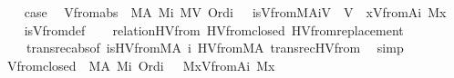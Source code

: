 \begin{isabellebody}
\isanewline
\ \ \isamarkupfalse%
\ {\isacharquery}{\kern0pt}case\ \isacommand{{\isachardot}{\kern0pt}}\isamarkupfalse%
\isanewline
{}\isamarkupfalse%
%
\endisatagproof
{\isafoldproof}%
%
\isadelimproof
\isanewline
%
\endisadelimproof
\isanewline
{}\isamarkupfalse%
\ Vfrom{\isacharunderscore}{\kern0pt}abs{\isacharcolon}{\kern0pt}\ {\isachardoublequoteopen}{\isasymlbrakk}\ M{\isacharparenleft}{\kern0pt}A{\isacharparenright}{\kern0pt}{\isacharsemicolon}{\kern0pt}\ M{\isacharparenleft}{\kern0pt}i{\isacharparenright}{\kern0pt}{\isacharsemicolon}{\kern0pt}\ M{\isacharparenleft}{\kern0pt}V{\isacharparenright}{\kern0pt}{\isacharsemicolon}{\kern0pt}\ Ord{\isacharparenleft}{\kern0pt}i{\isacharparenright}{\kern0pt}\ {\isasymrbrakk}\ {\isasymLongrightarrow}\ is{\isacharunderscore}{\kern0pt}Vfrom{\isacharparenleft}{\kern0pt}M{\isacharcomma}{\kern0pt}A{\isacharcomma}{\kern0pt}i{\isacharcomma}{\kern0pt}V{\isacharparenright}{\kern0pt}\ {\isasymlongleftrightarrow}\ V\ {\isacharequal}{\kern0pt}\ {\isacharbraceleft}{\kern0pt}x{\isasymin}Vfrom{\isacharparenleft}{\kern0pt}A{\isacharcomma}{\kern0pt}i{\isacharparenright}{\kern0pt}{\isachardot}{\kern0pt}\ M{\isacharparenleft}{\kern0pt}x{\isacharparenright}{\kern0pt}{\isacharbraceright}{\kern0pt}{\isachardoublequoteclose}\isanewline
%
\isadelimproof
\ \ %
\endisadelimproof
%
\isatagproof
{}\isamarkupfalse%
\ is{\isacharunderscore}{\kern0pt}Vfrom{\isacharunderscore}{\kern0pt}def\isanewline
\ \ \isamarkupfalse%
\ relation{}{\isacharunderscore}{\kern0pt}HVfrom\ HVfrom{\isacharunderscore}{\kern0pt}closed\ HVfrom{\isacharunderscore}{\kern0pt}replacement\ \isanewline
\ \ \ \ transrec{\isacharunderscore}{\kern0pt}abs{\isacharbrackleft}{\kern0pt}of\ {\isachardoublequoteopen}is{\isacharunderscore}{\kern0pt}HVfrom{\isacharparenleft}{\kern0pt}M{\isacharcomma}{\kern0pt}A{\isacharparenright}{\kern0pt}{\isachardoublequoteclose}\ i\ {\isachardoublequoteopen}HVfrom{\isacharparenleft}{\kern0pt}M{\isacharcomma}{\kern0pt}A{\isacharparenright}{\kern0pt}{\isachardoublequoteclose}{\isacharbrackright}{\kern0pt}\ transrec{\isacharunderscore}{\kern0pt}HVfrom\ \isamarkupfalse%
\ simp%
\endisatagproof
{\isafoldproof}%
%
\isadelimproof
\isanewline
%
\endisadelimproof
\isanewline
{}\isamarkupfalse%
\ Vfrom{\isacharunderscore}{\kern0pt}closed{\isacharcolon}{\kern0pt}\ {\isachardoublequoteopen}{\isasymlbrakk}\ M{\isacharparenleft}{\kern0pt}A{\isacharparenright}{\kern0pt}{\isacharsemicolon}{\kern0pt}\ M{\isacharparenleft}{\kern0pt}i{\isacharparenright}{\kern0pt}{\isacharsemicolon}{\kern0pt}\ Ord{\isacharparenleft}{\kern0pt}i{\isacharparenright}{\kern0pt}\ {\isasymrbrakk}\ {\isasymLongrightarrow}\ M{\isacharparenleft}{\kern0pt}{\isacharbraceleft}{\kern0pt}x{\isasymin}Vfrom{\isacharparenleft}{\kern0pt}A{\isacharcomma}{\kern0pt}i{\isacharparenright}{\kern0pt}{\isachardot}{\kern0pt}\ M{\isacharparenleft}{\kern0pt}x{\isacharparenright}{\kern0pt}{\isacharbraceright}{\kern0pt}{\isacharparenright}{\kern0pt}{\isachardoublequoteclose}\isanewline

\end{isabellebody}
